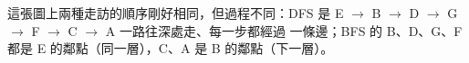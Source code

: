 \begin{pastsoln}
這張圖上兩種走訪的順序剛好相同，但過程不同：DFS 是 E $\to$ B $\to$ D $\to$ G $\to$ F $\to$ C $\to$ A 一路往深處走、每一步都經過
一條邊；BFS 的 B、D、G、F 都是 E 的鄰點（同一層），C、A 是 B 的鄰點（下一層）。
\end{pastsoln}
